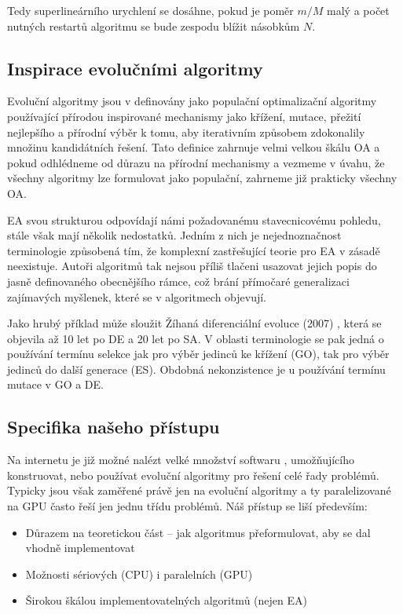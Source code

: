 Tedy superlineárního urychlení se dosáhne, pokud je poměr $m/M$ malý a počet nutných restartů algoritmu se bude zespodu blížit násobkům $N$.

\subsection{Inspirace evolučními algoritmy}
Evoluční algoritmy jsou v \cite{GO ebook} definovány jako \bq populační optimalizační algoritmy používající přírodou inspirované mechanismy jako křížení, mutace, přežití nejlepšího a přírodní výběr k tomu, aby iterativním způsobem zdokonalily množinu kandidátních řešení\eq. Tato definice zahrnuje velmi velkou škálu OA a pokud odhlédneme od důrazu na přírodní mechanismy a vezmeme v úvahu, že všechny algoritmy lze formulovat jako populační, zahrneme již prakticky všechny OA.

EA svou strukturou odpovídají námi požadovanému stavecnicovému pohledu, stále však mají několik nedostatků. Jedním z nich je nejednoznačnost terminologie způsobená tím, že komplexní zastřešující teorie pro EA v zásadě neexistuje. Autoři algoritmů tak nejsou příliš tlačeni usazovat jejich popis do jasně definovaného obecnějšího rámce, což brání přímočaré generalizaci zajímavých myšlenek, které se v algoritmech objevují.

Jako hrubý příklad může sloužit Žíhaná diferenciální evoluce (2007) \cite{DE annealed}, která se objevila až 10 let po DE a 20 let po SA. V oblasti terminologie se pak jedná o používání termínu selekce jak pro výběr jedinců ke křížení (GO), tak pro výběr jedinců do další generace (ES). Obdobná nekonzistence je u používání termínu mutace v GO a DE.

\subsection{Specifika našeho přístupu}
Na internetu je již možné nalézt velké množství softwaru \cite{Evolving Objects}, \cite{PUGACE} umožňujícího konstruovat, nebo používat evoluční algoritmy pro řešení celé řady problémů. Typicky jsou však zaměřené právě jen na evoluční algoritmy a ty paralelizované na GPU často řeší jen jednu třídu problémů. Náš přístup se liší především:
\begin{itemize}
  \item Důrazem na teoretickou část -- jak algoritmus přeformulovat, aby se dal vhodně implementovat
  \item Možnosti sériových (CPU) i paralelních (GPU)
  \item Širokou škálou implementovatelných algoritmů (nejen EA)
\end{itemize}

